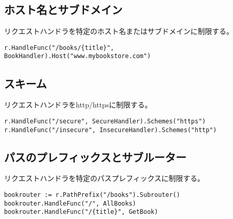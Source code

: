 \subsection{ホスト名とサブドメイン}

リクエストハンドラを特定のホスト名またはサブドメインに制限する。

\begin{lstlisting}[numbers=none]
r.HandleFunc("/books/{title}", BookHandler).Host("www.mybookstore.com")
\end{lstlisting}

\subsection{スキーム}

リクエストハンドラをhttp/httpsに制限する。

\begin{lstlisting}[numbers=none]
r.HandleFunc("/secure", SecureHandler).Schemes("https")
r.HandleFunc("/insecure", InsecureHandler).Schemes("http")
\end{lstlisting}

\subsection{パスのプレフィックスとサブルーター}

リクエストハンドラを特定のパスプレフィックスに制限する。

\begin{lstlisting}[numbers=none]
bookrouter := r.PathPrefix("/books").Subrouter()
bookrouter.HandleFunc("/", AllBooks)
bookrouter.HandleFunc("/{title}", GetBook)
\end{lstlisting}









